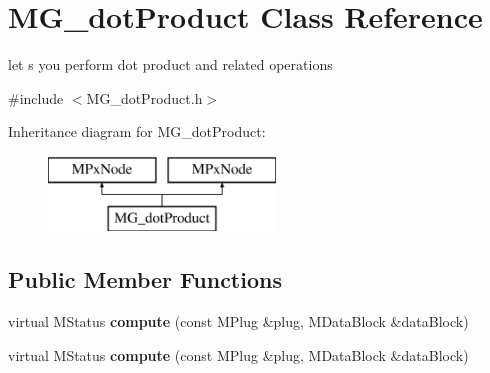 \hypertarget{class_m_g__dot_product}{\section{M\-G\-\_\-dot\-Product Class Reference}
\label{class_m_g__dot_product}
}


let s you perform dot product and related operations  




{\ttfamily \#include $<$M\-G\-\_\-dot\-Product.\-h$>$}

Inheritance diagram for M\-G\-\_\-dot\-Product\-:\begin{figure}[H]
\begin{center}
\leavevmode
\includegraphics[height=2.000000cm]{class_m_g__dot_product}
\end{center}
\end{figure}
\subsection*{Public Member Functions}
\begin{DoxyCompactItemize}
\item 
\hypertarget{class_m_g__dot_product_a780fdeacba666efcead24e6668603ef8}{virtual M\-Status {\bfseries compute} (const M\-Plug \&plug, M\-Data\-Block \&data\-Block)}\label{class_m_g__dot_product_a780fdeacba666efcead24e6668603ef8}

\item 
\hypertarget{class_m_g__dot_product_a780fdeacba666efcead24e6668603ef8}{virtual M\-Status {\bfseries compute} (const M\-Plug \&plug, M\-Data\-Block \&data\-Block)}\label{class_m_g__dot_product_a780fdeacba666efcead24e6668603ef8}

\end{DoxyCompactItemize}

